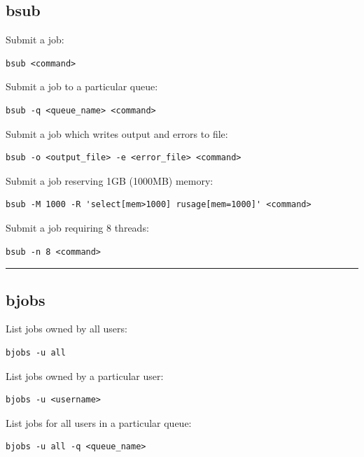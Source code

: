 \documentclass[11pt]{article}
\begin{document}
    \subsection{bsub}\label{bsub}

Submit a job:

\begin{verbatim}
bsub <command>
\end{verbatim}

Submit a job to a particular queue:

\begin{verbatim}
bsub -q <queue_name> <command>
\end{verbatim}

Submit a job which writes output and errors to file:

\begin{verbatim}
bsub -o <output_file> -e <error_file> <command>
\end{verbatim}

Submit a job reserving 1GB (1000MB) memory:

\begin{verbatim}
bsub -M 1000 -R 'select[mem>1000] rusage[mem=1000]' <command>
\end{verbatim}

Submit a job requiring 8 threads:

\begin{verbatim}
bsub -n 8 <command>
\end{verbatim}

    \begin{center}\rule{0.5\linewidth}{\linethickness}\end{center}

    \subsection{bjobs}\label{bjobs}

List jobs owned by all users:

\begin{verbatim}
bjobs -u all
\end{verbatim}

List jobs owned by a particular user:

\begin{verbatim}
bjobs -u <username>
\end{verbatim}

List jobs for all users in a particular queue:

\begin{verbatim}
bjobs -u all -q <queue_name>
\end{verbatim}
\end{document}
